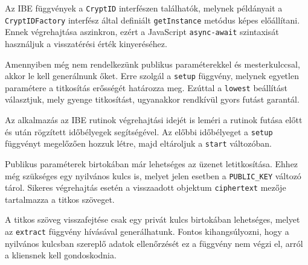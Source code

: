 

Az IBE függvények a \texttt{CryptID} interfészen találhatók, melynek példányait a \texttt{CryptIDFactory} interfész által definiált \texttt{getInstance} metódus képes előállítani. Ennek végrehajtása aszinkron, ezért a JavaScript \texttt{async-await} szintaxisát használjuk a visszatérési érték kinyeréséhez.



Amennyiben még nem rendelkezünk publikus paraméterekkel és mesterkulccsal, akkor le kell generálnunk őket. Erre szolgál a \texttt{setup} függvény, melynek egyetlen paramétere a titkosítás erősségét határozza meg. Ezúttal a \texttt{lowest} beállítást választjuk, mely gyenge titkosítást, ugyanakkor rendkívül gyors futást garantál.

Az alkalmazás az IBE rutinok végrehajtási idejét is leméri a rutinok futása előtt és után rögzített időbélyegek segítségével. Az előbbi időbélyeget a \texttt{setup} függvényt megelőzően hozzuk létre, majd eltároljuk a \texttt{start} változóban.



Publikus paraméterek birtokában már lehetséges az üzenet letitkosítása. Ehhez még szükséges egy nyilvános kulcs is, melyet jelen esetben a \texttt{PUBLIC\_KEY} változó tárol. Sikeres végrehajtás esetén a visszaadott objektum \texttt{ciphertext} mezője tartalmazza a titkos szöveget.



A titkos szöveg visszafejtése csak egy privát kulcs birtokában lehetséges, melyet az \texttt{extract} függvény hívásával generálhatunk. Fontos kihangsúlyozni, hogy a nyilvános kulcsban szereplő adatok ellenőrzését ez a függvény nem végzi el, arról a kliensnek kell gondoskodnia.



